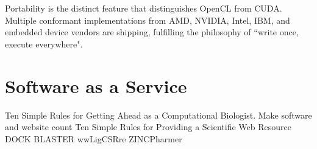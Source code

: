 Portability is the distinct feature that distinguishes OpenCL from CUDA. Multiple conformant implementations from AMD, NVIDIA, Intel, IBM, and embedded device vendors are shipping, fulfilling the philosophy of ``write once, execute everywhere".

\section{Software as a Service}

Ten Simple Rules for Getting Ahead as a Computational Biologist. Make software and website count \citep{260}
Ten Simple Rules for Providing a Scientific Web Resource \citep{677}
DOCK BLASTER \citep{557}
wwLigCSRre
ZINCPharmer

\chapterend
